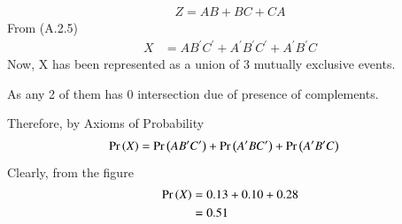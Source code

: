\documentclass[journal,12pt,twocolumn]{IEEEtran}
\begin{document}
\begin{enumerate}[label=(\alph*)]
\begin{align}
    Z=AB+BC+CA
\end{align}
From (A.2.5)
\begin{align}
    X&=AB^\prime C^\prime+A^\prime B^\prime C^\prime+A^\prime B^\prime C
\end{align}
Now, X has been represented as a union of 3 mutually exclusive events.

As any 2 of them has 0 intersection due of presence of complements.

Therefore, by Axioms of Probability
\begin{align}
    \Pr\left(X\right)&=\Pr\left(AB^\prime C^\prime\right)+\Pr\left(A^\prime BC^\prime\right)+\Pr\left(A^\prime B^\prime C\right)
\end{align}
Clearly, from the figure
\begin{align}
    \Pr\left(X\right)&=0.13+0.10+0.28\\
    &=0.51
\end{align}

\end{enumerate}
\end{document}
